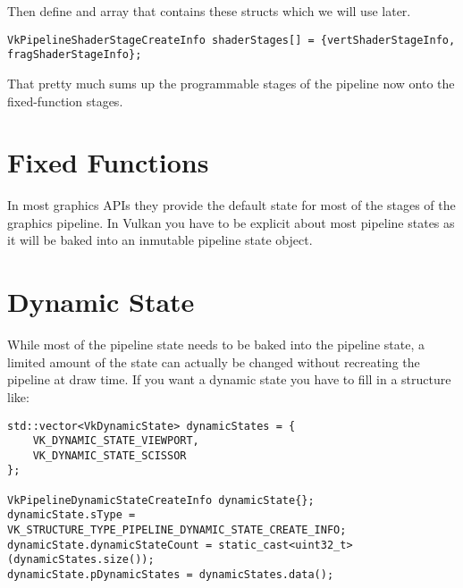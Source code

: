 \par Then define and array that contains these structs which we will use later.

\begin{center}
\begin{minipage}{0.95\linewidth}
\begin{lstlisting}
VkPipelineShaderStageCreateInfo shaderStages[] = {vertShaderStageInfo, fragShaderStageInfo};
\end{lstlisting}
\end{minipage}
\end{center}

\par That pretty much sums up the programmable stages of the pipeline now onto the fixed-function stages.

\section*{Fixed Functions}

\par In most graphics APIs they provide the default state for most of the stages of the graphics pipeline. In Vulkan you have to be explicit about most pipeline states as it will be baked into an inmutable pipeline state object.

\section*{Dynamic State}

\par While most of the pipeline state needs to be baked into the pipeline state, a limited amount of the state can actually be changed without recreating the pipeline at draw time. If you want a dynamic state you have to fill in a  structure like:

\begin{center}
\begin{minipage}{0.95\linewidth}
\begin{lstlisting}
std::vector<VkDynamicState> dynamicStates = {
    VK_DYNAMIC_STATE_VIEWPORT,
    VK_DYNAMIC_STATE_SCISSOR
};

VkPipelineDynamicStateCreateInfo dynamicState{};
dynamicState.sType = VK_STRUCTURE_TYPE_PIPELINE_DYNAMIC_STATE_CREATE_INFO;
dynamicState.dynamicStateCount = static_cast<uint32_t>(dynamicStates.size());
dynamicState.pDynamicStates = dynamicStates.data();
\end{lstlisting}
\end{minipage}
\end{center}

